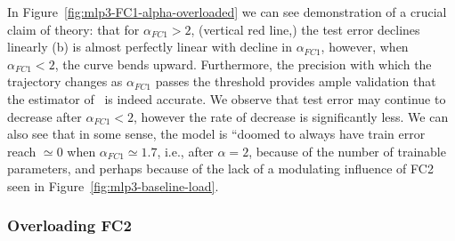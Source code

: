 In Figure~\ref{fig:mlp3-FC1-alpha-overloaded} we can see 
demonstration of a crucial claim of \SETOL theory: that for $\alpha_{FC1} > 2$, (vertical red line,) the test 
error declines linearly (b) is almost perfectly linear with decline in $\alpha_{FC1}$, however, when $\alpha_{FC1} < 2$, the curve bends 
upward. 
Furthermore, the precision with which the trajectory changes as $\alpha_{FC1}$ passes the threshold provides ample 
validation that the estimator of~\cite{CSN09_powerlaw} is indeed accurate. We 
observe that test error may continue to decrease after $\alpha_{FC1} < 2$, however the rate of decrease is significantly less. 
We can also see that in some sense, the model is ``doomed to always have train error reach $\simeq 0$ when 
$\alpha_{FC1} \simeq 1.7$, i.e., after $\alpha = 2$, because of the number of trainable parameters, and perhaps because 
of the lack of a modulating influence of FC2 seen in Figure~\ref{fig:mlp3-baseline-load}.





\subsubsection{Overloading FC2}
\label{sxn:hysteresis_effect_FC2}

